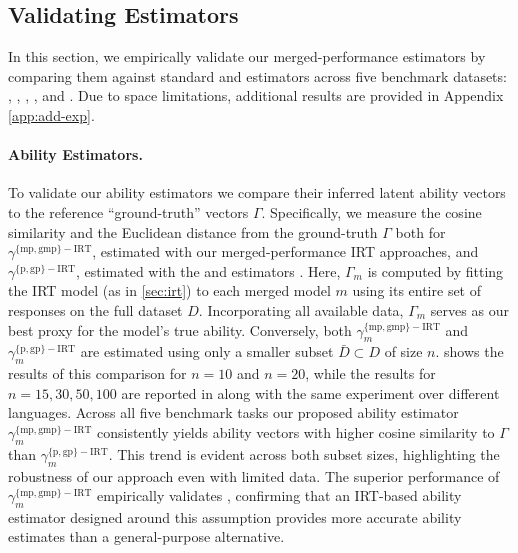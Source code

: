 \subsection{Validating Estimators}
In this section, we empirically validate our merged-performance estimators by comparing them against standard \pirt{} and \gpirt{} estimators \cite{tinybenchmarks} across five benchmark datasets:  \cite{gsm8k},  \cite{sakaguchi2021winogrande},  \cite{lin2021truthfulqa},  \cite{zellers2019hellaswag}, and  \cite{ARC}. Due to space limitations, additional results are provided in Appendix \ref{app:add-exp}.


\paragraph{Ability Estimators.} 
\label{sec:exp_validation}
%
To validate our ability estimators we compare their inferred latent ability vectors to the reference ``ground-truth'' vectors \(\Gamma\). Specifically, we measure the cosine similarity and the Euclidean distance from the ground-truth \(\Gamma\) both for \(\gamma^{{\{\mathrm{mp,gmp}\}-\mathrm{IRT}}}\), estimated with our merged-performance IRT approaches, and \(\gamma^{\{\mathrm{p,gp}\}-\mathrm{IRT}}\), estimated with the \pirt{} and \gpirt{} estimators \citep{tinybenchmarks}.
Here, \(\Gamma_{m}\) is computed by fitting the IRT model (as in \cref{sec:irt}) to each merged model \(m\) using its entire set of responses on the full dataset \(D\). Incorporating all available data, \(\Gamma_{m}\) serves as our best proxy for the model’s true ability. Conversely, both \(\gamma_m^{{\{\mathrm{mp,gmp}\}-\mathrm{IRT}}}\) and \(\gamma_m^{\{\mathrm{p,gp}\}-\mathrm{IRT}}\) are estimated using only a smaller subset \(\bar{D} \subset D\) of size \(n\).
 shows the results of this comparison for $n=10$ and $n=20$, while the results for $n=15, 30, 50, 100$ are reported in  along with the same experiment over different languages. 
Across all five benchmark tasks our proposed ability estimator \(\gamma_m^{{\{\mathrm{mp,gmp}\}-\mathrm{IRT}}}\) consistently yields ability vectors with higher cosine similarity to \(\Gamma\) than \(\gamma_m^{\{\mathrm{p,gp}\}-\mathrm{IRT}}\). This trend is evident across both subset sizes, highlighting the robustness of our approach even with limited data. The superior performance of \(\gamma_m^{{\{\mathrm{mp,gmp}\}-\mathrm{IRT}}}\) empirically validates , confirming that an IRT-based ability estimator designed around this assumption provides more accurate ability estimates than a general-purpose alternative.

